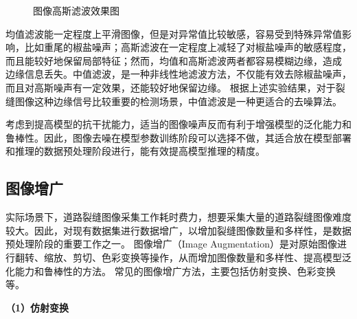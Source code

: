 \begin{figure}[H]
	\caption{图像高斯滤波效果图}
	\label{gaussian}
\end{figure}

均值滤波能一定程度上平滑图像，但是对异常值比较敏感，容易受到特殊异常值影响，比如重尾的椒盐噪声；高斯滤波在一定程度上减轻了对椒盐噪声的敏感程度，而且能较好地保留局部特征；然而，均值和高斯滤波两者都容易模糊边缘，造成
边缘信息丢失。中值滤波，是一种非线性地滤波方法，不仅能有效去除椒盐噪声，而且对高斯噪声有一定效果，还能较好地保留边缘。
根据上述实验结果，对于裂缝图像这种边缘信号比较重要的检测场景，中值滤波是一种更适合的去噪算法。

考虑到提高模型的抗干扰能力，适当的图像噪声反而有利于增强模型的泛化能力和鲁棒性。因此，图像去噪在模型参数训练阶段可以选择不做，其适合放在模型部署和推理的数据预处理阶段进行，能有效提高模型推理的精度。

\subsection{图像增广}
实际场景下，道路裂缝图像采集工作耗时费力，想要采集大量的道路裂缝图像难度较大。因此，对现有数据集进行数据增广，以增加裂缝图像数量和多样性，是数据预处理阶段的重要工作之一。
图像增广（Image Augmentation）是对原始图像进行翻转、缩放、剪切、色彩变换等操作，从而增加图像数量和多样性、提高模型泛化能力和鲁棒性的方法。
常见的图像增广方法，主要包括仿射变换、色彩变换等。

\textbf{（1）仿射变换}

